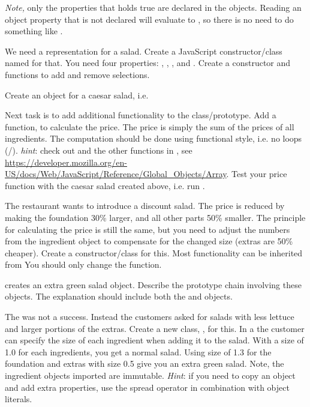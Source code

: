 \documentclass[fleqn, article, a4paper]{memoir}
\begin{document}
\begin{Assignments}
\noindent \emph{Note,} only the properties that holds true are declared in the objects. Reading an object property that is not declared will evaluate to , so there is no need to do something like .

\item We need a representation for a salad. Create a JavaScript constructor/class named  for that. You need four properties: , , , and . Create a constructor and functions to add and remove selections.

\item Create an object for a caesar salad, i.e. 

\item Next task is to add additional functionality to the  class/prototype. Add a function,  to calculate the price. The price is simply the sum of the prices of all ingredients. The computation should be done using functional style, i.e. no loops (/). \emph{hint}: check out  and the other functions in , see \url{https://developer.mozilla.org/en-US/docs/Web/JavaScript/Reference/Global_Objects/Array}. Test your price function with the caesar salad created above, i.e. run .

\item The restaurant wants to introduce a discount salad. The price is reduced by making the foundation 30\% larger, and all other parts 50\% smaller. The principle for calculating the price is still the same, but you need to adjust the numbers from the ingredient object to compensate for the changed size (extras are 50\% cheaper). Create a  constructor/class for this. Most functionality can be inherited from  You should only change the  function.

\item {} creates an extra green salad object. Describe the prototype chain involving these objects. The explanation should include both the  and  objects.

\item The  was not a success. Instead the customers asked for salads with less lettuce and larger portions of the extras. Create a new class, , for this. In a  the customer can specify the size of each ingredient when adding it to the salad. With a size of 1.0 for each ingredients, you get a normal salad. Using size of 1.3 for the foundation and extras with size 0.5 give you an extra green salad. Note, the ingredient objects imported are immutable. \emph{Hint}: if you need to copy an object and add extra properties, use the spread operator in combination with object literals.


\end{Assignments}
\end{document}
